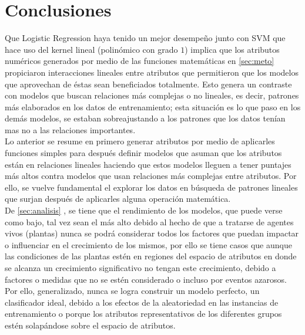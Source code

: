 \documentclass[12pt,a4paper]{article}
\begin{document}
    \section{Conclusiones}
    {
        Que Logistic Regression haya tenido un mejor desempeño junto con SVM que hace 
        uso del kernel lineal (polinómico con grado $1$) implica que los atributos numéricos 
        generados por medio de las funciones matemáticas en \ref{sec:meto}  
        propiciaron interacciones lineales entre atributos que permitieron que los modelos 
        que aprovechan de éstas sean beneficiados totalmente. Esto genera un contraste con 
        modelos que buscan relaciones más complejas o no lineales, es decir, patrones más 
        elaborados en los datos de entrenamiento; esta situación es lo que paso en los demás 
        modelos, se estaban sobreajustando a los patrones que los datos tenían mas no a 
        las relaciones importantes.\\

        Lo anterior se resume en primero generar atributos por medio de aplicarles funciones 
        simples para después definir modelos que asuman que los atributos están en relaciones 
        lineales haciendo que estos modelos lleguen a tener puntajes más altos contra modelos 
        que usan relaciones más complejas entre atributos. Por ello, se vuelve fundamental 
        el explorar los datos en búsqueda de patrones lineales que surjan después de aplicarles 
        alguna operación matemática.\\

        De \ref{sec:analisis} , se tiene que el rendimiento de los modelos, 
        que puede verse como bajo, tal vez sean el más alto debido al hecho de que a tratarse de 
        agentes vivos (plantas) nunca se podrá considerar todos los factores que puedan impactar o 
        influenciar en el crecimiento de los mismos, por ello se tiene casos que aunque las condiciones 
        de las plantas estén en regiones del espacio de atributos en donde se alcanza un crecimiento 
        significativo no tengan este crecimiento, debido a factores o medidas que no se estén considerado 
        o incluso por eventos azarosos. Por ello, generalizado, nunca se logra construir un modelo 
        perfecto, un clasificador ideal, debido a los efectos de la aleatoriedad en las instancias 
        de entrenamiento o porque los atributos representativos de los diferentes grupos estén 
        solapándose sobre el espacio de atributos.
    }
    \newpage

    \printbibliography[heading=bibintoc,title={Referencias Bibliográficas}]
\end{document}

